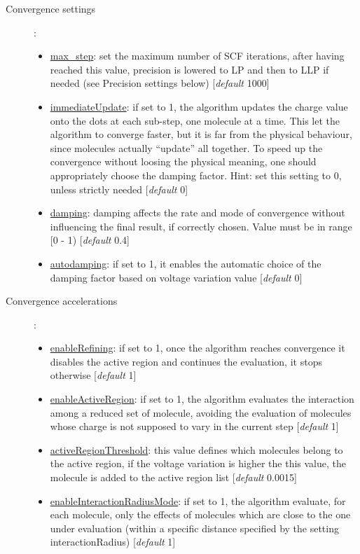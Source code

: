 \documentclass[a4paper,10pt]{article}
\begin{document}
\begin{description}
\item[Convergence settings]:
	\begin{itemize}
	\item \underline{max\_step}: set the maximum number of SCF iterations, after having reached this value, precision is lowered to LP and then to LLP if needed (see Precision settings below) [\textit{default} 1000] 
	\item \underline{immediateUpdate}: if set to 1, the algorithm updates the charge value onto the dots at each sub-step, one molecule at a time. This let the algorithm to converge faster, but it is far from the physical behaviour, since molecules actually \enquote{update} all together. To speed up the convergence without loosing the physical meaning, one should appropriately choose the damping factor. Hint: set this setting to 0, unless strictly needed [\textit{default} 0] 
	\item \underline{damping}: damping affects the rate and mode of convergence without influencing the final result, if correctly chosen. Value must be in range [0 - 1) [\textit{default} 0.4] 
	\item \underline{autodamping}: if set to 1, it enables the automatic choice of the damping factor based on voltage variation value [\textit{default} 0]
	\end{itemize}
\item[Convergence accelerations]:
	\begin{itemize}
	\item \underline{enableRefining}: if set to 1, once the algorithm reaches convergence it disables the active region and continues the evaluation, it stops otherwise [\textit{default} 1] 
	\item \underline{enableActiveRegion}: if set to 1, the algorithm evaluates the interaction among a reduced set of molecule, avoiding the evaluation of molecules whose charge is not supposed to vary in the current step [\textit{default} 1] 
	\item \underline{activeRegionThreshold}: this value defines which molecules belong to the active region, if the voltage variation is higher  the this value, the molecule is added to the active region list [\textit{default} 0.0015] 
	\item \underline{enableInteractionRadiusMode}: if set to 1, the algorithm evaluate, for each molecule, only the effects of molecules which are close to the one under evaluation (within a specific distance specified by the setting interactionRadius) [\textit{default} 1] 

\end{itemize}
\end{description}
\end{document}
